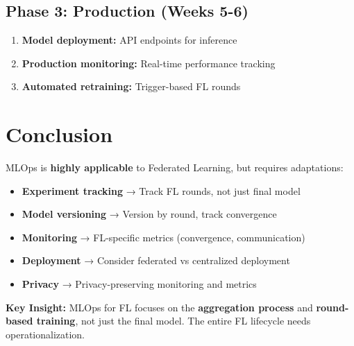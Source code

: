\documentclass[12pt]{article}
\begin{document}
\subsection{Phase 3: Production (Weeks 5-6)}

\begin{enumerate}
    \item \textbf{Model deployment:} API endpoints for inference
    \item \textbf{Production monitoring:} Real-time performance tracking
    \item \textbf{Automated retraining:} Trigger-based FL rounds
\end{enumerate}

\section{Conclusion}

MLOps is \textbf{highly applicable} to Federated Learning, but requires adaptations:

\begin{itemize}
    \item \textbf{Experiment tracking} → Track FL rounds, not just final model
    \item \textbf{Model versioning} → Version by round, track convergence
    \item \textbf{Monitoring} → FL-specific metrics (convergence, communication)
    \item \textbf{Deployment} → Consider federated vs centralized deployment
    \item \textbf{Privacy} → Privacy-preserving monitoring and metrics
\end{itemize}

\textbf{Key Insight:} MLOps for FL focuses on the \textbf{aggregation process} and \textbf{round-based training}, not just the final model. The entire FL lifecycle needs operationalization.
\end{document}
